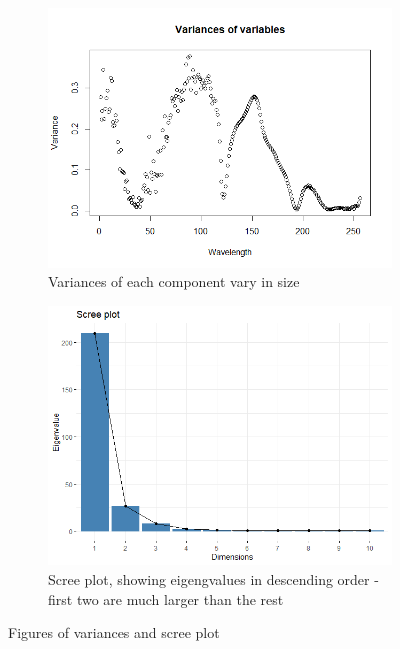 \documentclass[12pt]{article}
\begin{document}
\begin{figure}[h!]
    \begin{subfigure}[b]{0.5\linewidth}
        \centering
        \includegraphics[width=\textwidth]{../images/project1/variances.png}
     \caption{Variances of each component vary in size}\label{fig:var}
    \end{subfigure}%
    \begin{subfigure}[b]{0.5\linewidth}
        \centering
     \includegraphics[width=\textwidth]{../images/project1/screePlot.png}
     \caption{Scree plot, showing eigengvalues in descending order - first two are much larger than the rest}\label{fig:scree}
    \end{subfigure}%
   \caption{Figures of variances and scree plot}
\end{figure}
\end{document}
